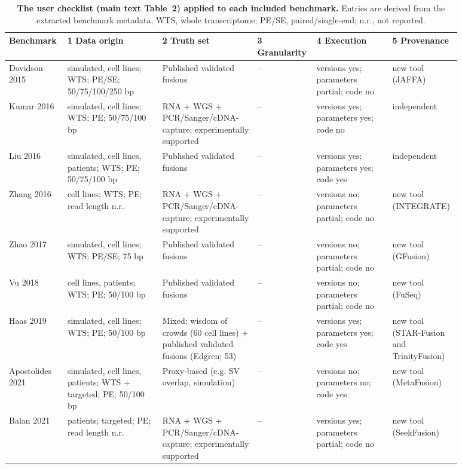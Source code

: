 \begin{table}[!htbp]
\centering
\scriptsize
\caption{\textbf{The user checklist (main text Table~2) applied to each included benchmark.} Entries are derived from the extracted benchmark metadata; WTS, whole transcriptome; PE/SE, paired/single-end; n.r., not reported. }
\label{tab:supp_checklist_applied}
\begin{tabular}{p{0.11\linewidth}p{0.2\linewidth}p{0.2\linewidth}p{0.08\linewidth}p{0.16\linewidth}p{0.13\linewidth}}
\toprule
Benchmark & 1 Data origin & 2 Truth set & 3 Granularity & 4 Execution & 5 Provenance \\
\midrule
Davidson 2015 & simulated, cell lines; WTS; PE/SE; 50/75/100/250 bp & Published validated fusions & -- & versions yes; parameters partial; code no & new tool (JAFFA) \\
Kumar 2016 & simulated, cell lines; WTS; PE; 50/75/100 bp & RNA + WGS + PCR/Sanger/cDNA-capture; experimentally supported & -- & versions yes; parameters yes; code no & independent \\
Liu 2016 & simulated, cell lines, patients; WTS; PE; 50/75/100 bp & Published validated fusions & -- & versions yes; parameters yes; code yes & independent \\
Zhang 2016 & cell lines; WTS; PE; read length n.r. & RNA + WGS + PCR/Sanger/cDNA-capture; experimentally supported & -- & versions no; parameters partial; code no & new tool (INTEGRATE) \\
Zhao 2017 & simulated, cell lines; WTS; PE/SE; 75 bp & Published validated fusions & -- & versions no; parameters partial; code no & new tool (GFusion) \\
Vu 2018 & cell lines, patients; WTS; PE; 50/100 bp & Published validated fusions & -- & versions no; parameters partial; code no & new tool (FuSeq) \\
Haas 2019 & simulated, cell lines; WTS; PE; 50/100 bp & Mixed: wisdom of crowds (60 cell lines) + published validated fusions (Edgren; 53) & -- & versions yes; parameters yes; code yes & new tool (STAR-Fusion and TrinityFusion) \\
Apostolides 2021 & simulated, cell lines, patients; WTS + targeted; PE; 50/100 bp & Proxy-based (e.g. SV overlap, simulation) & -- & versions no; parameters no; code yes & new tool (MetaFusion) \\
Balan 2021 & patients; targeted; PE; read length n.r. & RNA + WGS + PCR/Sanger/cDNA-capture; experimentally supported & -- & versions yes; parameters partial; code no & new tool (SeekFusion) \\

\end{tabular}
\end{table}
